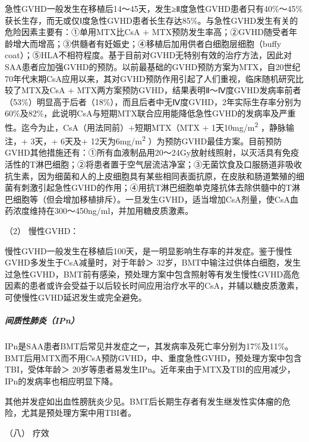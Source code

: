 急性GVHD一般发生在移植后14～45天，发生≥Ⅱ度急性GVHD患者只有40\%～45\%获长生存，而无或仅Ⅰ度急性GVHD患者长生存达85\%。与急性GVHD发生有关的危险因素主要有：①单用MTX比CsA
+
MTX预防发生率高；②GVHD随受者年龄增大而增高；③供髓者有妊娠史；④移植后加用供者白细胞层细胞（buffy
coat）；⑤HLA不相符程度。基于目前对GVHD无特别有效的治疗方法，因此对SAA患者应加强GVHD的预防。以前最基础的GVHD预防方案为MTX，自20世纪70年代末期CsA应用以来，其对GVHD预防作用引起了人们重视，临床随机研究比较了MTX及CsA
+
MTX两方案预防GVHD，结果表明Ⅱ～Ⅳ度GVHD发病率前者（53\%）明显高于后者（18\%），而且后者中无Ⅳ度GVHD，2年实际生存率分别为60\%及82\%，此说明CsA与短期MTX联合应用能降低急性GVHD的发病率及严重性。迄今为止，CsA（用法同前）+短期MTX（MTX
+ 1天10mg/m\textsuperscript{2} ，静脉输注，+ 3天，+ 6天及+
12天为6mg/m\textsuperscript{2}
）为预防GVHD最佳方案。目前预防GVHD其他措施还有：①所有血液制品用20～24Gy放射线照射，以灭活具有免疫活性的T淋巴细胞；②将患者置于空气层流洁净室；③无菌饮食及口服肠道非吸收抗生素，因为细菌和人的上皮细胞具有某些相同表面抗原，在皮肤和肠道繁殖的细菌有刺激引起急性GVHD的作用；④用抗T淋巴细胞单克隆抗体去除供髓中的T淋巴细胞等（但会增加移植排斥）。一旦发生GVHD，适当增加CsA剂量，使CsA血药浓度维持在300～450ng/ml，并加用糖皮质激素。

\hypertarget{text00089.htmlux5cux23CHP3-10-1-3-2-7-2-2}{}
（2） 慢性GVHD：

慢性GVHD一般发生在移植后100天，是一明显影响生存率的并发症。鉴于慢性GVHD多发生于CsA减量时，对于年龄＞
32岁，BMT中输注过供体白细胞，发生过急性GVHD，BMT前有感染，预处理方案中包含照射等有发生慢性GVHD高危因素的患者或许会受益于以后较长时间应用治疗水平的CsA，并辅以糖皮质激素，可使慢性GVHD延迟发生或完全避免。

\subparagraph{间质性肺炎（IPn）}

IPn是SAA患者BMT后常见并发症之一，其发病率及死亡率分别为17\%及11\%。BMT后用MTX而不用CsA预防GVHD，中、重度急性GVHD，预处理方案中包含TBI，受体年龄＞
20岁等患者易发生IPn。近年来由于MTX及TBI的应用减少，IPn的发病率也相应明显下降。

其他并发症如出血性膀胱炎少见。BMT后长期生存者有发生继发性实体瘤的危险，尤其是预处理方案中用TBI者。

\hypertarget{text00089.htmlux5cux23CHP3-10-1-3-2-8}{}
（八） 疗效

